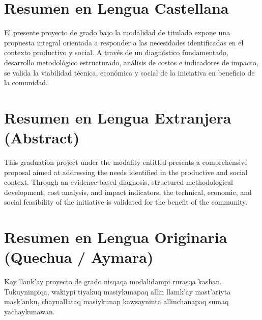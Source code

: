 
\section*{Resumen en Lengua Castellana}
El presente proyecto de grado bajo la modalidad de \textbf{\modalidad} titulado \textit{\tituloproyecto} expone una propuesta integral orientada a responder a las necesidades identificadas en el contexto productivo y social. A través de un diagnóstico fundamentado, desarrollo metodológico estructurado, análisis de costos e indicadores de impacto, se valida la viabilidad técnica, económica y social de la iniciativa en beneficio de la comunidad.


\newpage

\section*{Resumen en Lengua Extranjera (Abstract)}
This graduation project under the \textbf{\modalidad} modality entitled \textit{\tituloproyecto} presents a comprehensive proposal aimed at addressing the needs identified in the productive and social context. Through an evidence-based diagnosis, structured methodological development, cost analysis, and impact indicators, the technical, economic, and social feasibility of the initiative is validated for the benefit of the community.


\newpage

\section*{Resumen en Lengua Originaria (Quechua / Aymara)}
Kay llank'ay proyecto de grado nisqaqa \textbf{\modalidad} modalidampi rurasqa kashan. Tukuyninpiqa, wakiypi tiyakuq masiykunapaq allin llamk'ay mast'ariyta mask'anku, chaynallataq masiykunap kawsayninta allinchanapaq sumaq yachaykunawan.

